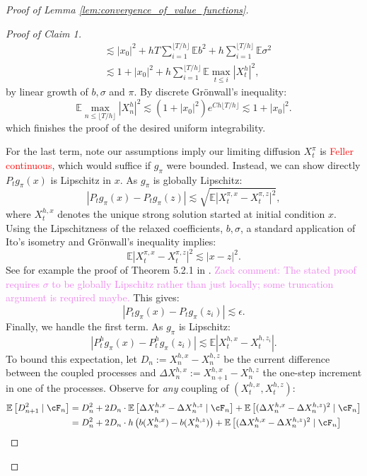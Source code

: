 \documentclass[11pt,oneside,reqno]{article}
\theoremstyle{plain}
\theoremstyle{definition}
\numberwithin{equation}{section}
\renewcommand{\cite}{\citet}
\renewcommand{\leq}{\leqslant}
\newcommand{\E}{\mathbb{E}}
\newcommand{\red}{\textcolor{red}}
\newcommand{\zack}[1]{\textcolor{Violet}{Zack comment: #1}}
\begin{document}
\begin{proof}[Proof of Lemma \ref{lem:convergence_of_value_functions}]
\begin{proof}[Proof of Claim 1]
\begin{align*}
			& \lesssim |x_0|^2 + h T \sum_{i=1}^{\lfloor T/h \rfloor} \E b^2 + h\sum_{i=1}^{\lfloor T/h \rfloor} \E \sigma^2 \\
			& \lesssim 1 + |x_0|^2 + h\sum_{i=1}^{\lfloor T/h \rfloor} \E  \max_{t \leq i} |X^h_t|^2,
		\end{align*}
		\noindent by linear growth of $b, \sigma$ and $\pi$. By discrete Gr\"onwall's inequality:
		\[\E\max_{n \leq \lfloor T/ h\rfloor} |X_n^h|^2 \lesssim (1+|x_0|^2)e^{Ch \lfloor T/h \rfloor} \lesssim 1 + |x_0|^2. \]
		\noindent which finishes the proof of the desired uniform integrability.

		 For the last term, note our assumptions imply our limiting diffusion $X^\pi_t$ is \red{Feller continuous}, which would suffice if $g_\pi$ were bounded. 
		 Instead, we can show directly $P_tg_\pi(x)$ is Lipschitz in $x$. As $g_\pi$ is globally Lipschitz:
		\[|P_t g_\pi(x) - P_t g_\pi(z)| \lesssim \sqrt{\E |X^{\pi, x}_t - X^{\pi, z}_t|^2}, \]
		\noindent where $X^{h,x}_t$ denotes the unique strong solution started at initial condition $x$. Using the Lipschitzness of the relaxed coefficients, $b, \sigma$, a standard application of Ito's isometry and Gr\"onwall's inequality implies:
		\[\E |X^{\pi, x}_t - X^{\pi, z}_t|^2 \lesssim |x-z|^2.\]
		\noindent See for example the proof of Theorem 5.2.1 in \cite{oksendal2003sde}. \zack{The stated proof requires $\sigma$ to be globally Lipschitz rather than just locally; some truncation argument is required maybe.} This gives:
		\[|P_t g_\pi(x) - P_t g_\pi(z_i)| \lesssim \epsilon.\]
		Finally, we handle the first term. As $g_\pi$ is Lipschitz:
		\[|P_t^h g_\pi(x) - P_t^h g_\pi(z_i)| \lesssim \E| X^{h,x}_t -  X^{h, z_i}_t|.\]
		\noindent To bound this expectation, let $D_n := X^{h,x}_n -  X^{h, z}_n$ be the current difference between the coupled processes and $\Delta X^{h,x}_n := X^{h,x}_{n+1} - X^{h,z}_n$ the one-step
		increment in one of the processes. Observe for \textit{any} coupling of $(X_t^{h,x}, X_t^{h,z})$:
		\begin{align*}
			\E \left[D_{n+1}^2 \mid \cF_n\right] & = D_n^2 + 2 D_n \cdot \E\left[\Delta X^{h,x}_n - \Delta X^{h,z}_n \mid \cF_n\right] + \E\left[(\Delta X^{h,x}_n - \Delta X^{h,z}_n)^2 \mid \cF_n\right] \\
			& = D_n^2 + 2 D_n \cdot h\left(b(X^{h,x}_n) - b(X^{h,z}_n)\right) + \E\left[(\Delta X^{h,x}_n - \Delta X^{h,z}_n)^2 \mid \cF_n\right]
		\end{align*}


\end{proof}
\end{proof}
\end{document}
